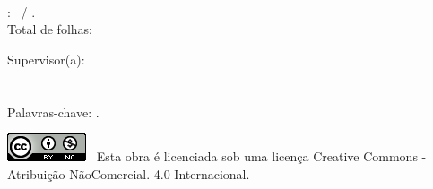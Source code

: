 \addtolength{\topmargin}{5cm}
\thispagestyle{empty}

\begin{framed}

{\raggedright \MySurnameForename} \\

\ProductTitle: \ProductSubtitle\ / \ContractYear. \\

Total de folhas: \pageref{LastPage} \\

\vspace{1cm}

Supervisor(a): \SupervisorName \\

\SiglaSecretaria \\

\NomeSecretaria \\

Palavras-chave: \PalavrasChave. \\

\end{framed}

\vspace{3cm}

{\raggedright \includegraphics{licenca-cc-by-nc.png} \ Esta obra é licenciada sob
uma licença Creative Commons - Atribuição-NãoComercial. 4.0 Internacional.}

\restoregeometry
\newpage
